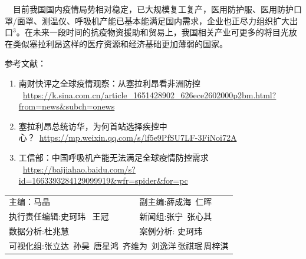 \documentclass[
]{article}
\begin{document}
\(\quad\)目前我国国内疫情局势相对稳定，已大规模复工复产，医用防护服、医用防护口罩/面罩、测温仪、呼吸机产能已基本能满足国内需求，企业也正尽力组织扩大出口\(^3\)。在未来一段时间的抗疫物资援助和贸易上，我国相关产业可更多的将目光放在类似塞拉利昂这样的医疗资源和经济基础更加薄弱的国家。

\small 参考文献：

\begin{enumerate}
\def\labelenumi{\arabic{enumi}.}
\item
  南财快评之全球疫情观察：从塞拉利昂看非洲防控
  ~\url{https://k.sina.com.cn/article_1651428902_626ece2602000p2bm.html?from=news\&subch=onews}
\item
  塞拉利昂总统访华，为何首站选择疾控中心？~\url{https://mp.weixin.qq.com/s/lf5e9PfSU7LF-3FiNoi72A}
\item
  工信部：中国呼吸机产能无法满足全球疫情防控需求
  ~\url{https://baijiahao.baidu.com/s?id=1663393284129099919\&wfr=spider\&for=pc}
\end{enumerate}

\centering
\small
\begin{tabular}{ll}

主编：马晶  &  副主编:薛成海\,  仁晖  \\
执行责任编辑:史珂玮 \, 王冠  & 新闻组:张宁\, 张心其 \\
数据分析:杜兆慧  &  案例分析: 史珂玮\\
\multicolumn{2}{l}{可视化组:张立达\, 孙昊\, 唐星鸿\, 齐维为\, 刘逸洋\,张祺珉\,周梓淇}

\end{tabular}
\end{document}

